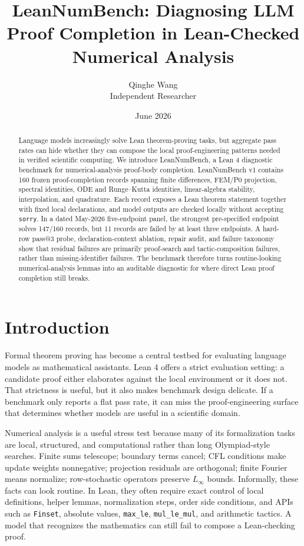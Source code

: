 \documentclass{article}
\title{LeanNumBench: Diagnosing LLM Proof Completion in Lean-Checked Numerical Analysis}
\author{Qinghe Wang\\
Independent Researcher}
\date{June 2026}
\begin{document}
\maketitle

\begin{abstract}
Language models increasingly solve Lean theorem-proving tasks, but aggregate
pass rates can hide whether they can compose the local proof-engineering
patterns needed in verified scientific computing. We introduce LeanNumBench,
a Lean 4 diagnostic benchmark for numerical-analysis proof-body completion.
LeanNumBench v1 contains 160 frozen proof-completion records spanning finite
differences, FEM/P0 projection, spectral identities, ODE and Runge--Kutta
identities, linear-algebra stability, interpolation, and quadrature. Each
record exposes a Lean theorem statement together with fixed local declarations,
and model outputs are checked locally without accepting \texttt{sorry}. In a
dated May-2026 five-endpoint panel, the strongest pre-specified endpoint
solves 147/160 records, but 11 records are failed by at least three endpoints.
A hard-row pass@3 probe, declaration-context ablation, repair audit, and
failure taxonomy show that residual failures are primarily proof-search and
tactic-composition failures, rather than missing-identifier failures. The
benchmark therefore turns routine-looking numerical-analysis lemmas into an
auditable diagnostic for where direct Lean proof completion still breaks.
\end{abstract}

\section{Introduction}

Formal theorem proving has become a central testbed for evaluating language
models as mathematical assistants. Lean 4 offers a strict evaluation setting:
a candidate proof either elaborates against the local environment or it does
not. That strictness is useful, but it also makes benchmark design delicate.
If a benchmark only reports a flat pass rate, it can miss the proof-engineering
surface that determines whether models are useful in a scientific domain.

Numerical analysis is a useful stress test because many of its formalization
tasks are local, structured, and computational rather than long
Olympiad-style searches. Finite sums telescope; boundary terms cancel; CFL
conditions make update weights nonnegative; projection residuals are
orthogonal; finite Fourier means normalize; row-stochastic operators preserve
$L_\infty$ bounds. Informally, these facts can look routine. In Lean, they
often require exact control of local definitions, helper lemmas, normalization
steps, order side conditions, and APIs such as \texttt{Finset}, absolute
values, \texttt{max\_le}, \texttt{mul\_le\_mul}, and arithmetic tactics. A
model that recognizes the mathematics can still fail to compose a
Lean-checking proof.
\end{document}
